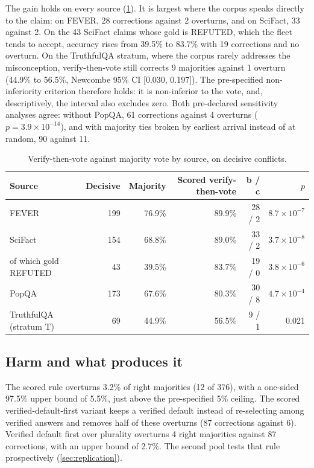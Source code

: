 The gain holds on every source (\cref{tab:sources}). It is largest where the corpus speaks directly to the claim: on FEVER, 28 corrections against 2 overturns, and on SciFact, 33 against 2. On the 43 SciFact claims whose gold is REFUTED, which the fleet tends to accept, accuracy rises from 39.5\% to 83.7\% with 19 corrections and no overturn. On the TruthfulQA stratum, where the corpus rarely addresses the misconception, verify-then-vote still corrects 9 majorities against 1 overturn (44.9\% to 56.5\%, Newcombe 95\% CI [0.030, 0.197]). The pre-specified non-inferiority criterion therefore holds: it is non-inferior to the vote, and, descriptively, the interval also excludes zero. Both pre-declared sensitivity analyses agree: without PopQA, 61 corrections against 4 overturns ($p = 3.9 \times 10^{-14}$), and with majority ties broken by earliest arrival instead of at random, 90 against 11.

\begin{table}[t]
  \centering
  \caption{Verify-then-vote against majority vote by source, on decisive conflicts.}
  \label{tab:sources}
  \small
  \begin{tabular}{@{}lrrrrr@{}}
    \toprule
    Source & Decisive & Majority & Scored verify-then-vote & b / c & $p$ \\
    \midrule
    FEVER & 199 & 76.9\% & 89.9\% & 28 / 2 & $8.7 \times 10^{-7}$ \\
    SciFact & 154 & 68.8\% & 89.0\% & 33 / 2 & $3.7 \times 10^{-8}$ \\
    \quad of which gold REFUTED & 43 & 39.5\% & 83.7\% & 19 / 0 & $3.8 \times 10^{-6}$ \\
    PopQA & 173 & 67.6\% & 80.3\% & 30 / 8 & $4.7 \times 10^{-4}$ \\
    TruthfulQA (stratum T) & 69 & 44.9\% & 56.5\% & 9 / 1 & 0.021 \\
    \bottomrule
  \end{tabular}
\end{table}

\subsection{Harm and what produces it}
\label{sec:harm-results}

The scored rule overturns 3.2\% of right majorities (12 of 376), with a one-sided 97.5\% upper bound of 5.5\%, just above the pre-specified 5\% ceiling. The scored verified-default-first variant keeps a verified default instead of re-selecting among verified answers and removes half of these overturns (87 corrections against 6). Verified default first over plurality overturns 4 right majorities against 87 corrections, with an upper bound of 2.7\%. The second pool tests that rule prospectively (\cref{sec:replication}).

